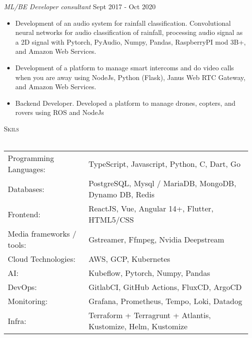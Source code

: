\documentclass[a4paper]{article}
\newcommand{\lineunder} {
    \vspace*{-8pt} \\
    \hspace*{-18pt} \hrulefill \\
}
\newcommand{\header} [1] {
    {\hspace*{-18pt}\vspace*{6pt} \textsc{#1}}
    \vspace*{-6pt} \lineunder
}
\begin{document}
\textit{ML/BE Developer consultant} \hfill Sept 2017 - Oct 2020\\
\vspace{-1mm}
\begin{itemize} \itemsep 1pt
	\item Development of an audio system for rainfall classification. Convolutional neural networks for audio classification of rainfall, processing audio signal as a 2D signal with Pytorch, PyAudio, Numpy, Pandas, RaspberryPI mod 3B+, and Amazon Web Services.
	\item Development of a platform to manage smart intercoms and do video calls when you are away using NodeJs, Python (Flask), Janus Web RTC Gateway, and Amazon Web Services.
	\item Backend Developer. Developed a platform to manage drones, copters, and rovers using ROS and NodeJs
\end{itemize}

\header{Skils}
\begin{tabular}{ l l }
	Programming Languages:    & TypeScript, Javascript, Python, C, Dart, Go                   \\
	Databases:                & PostgreSQL, Mysql / MariaDB, MongoDB, Dynamo DB, Redis        \\
	Frontend:                 & ReactJS, Vue, Angular 14+, Flutter, HTML5/CSS                 \\
	Media frameworks / tools: & Gstreamer, Ffmpeg, Nvidia Deepstream                          \\
	Cloud Technologies:       & AWS, GCP, Kubernetes                                          \\
	AI:                       & Kubeflow, Pytorch, Numpy, Pandas                              \\
	DevOps:                   & GitlabCI, GitHub Actions, FluxCD, ArgoCD                      \\
	Monitoring:               & Grafana, Prometheus, Tempo, Loki, Datadog                     \\
	Infra:                    & Terraform + Terragrunt + Atlantis, Kustomize, Helm, Kustomize \\
\end{tabular}
\vspace{2mm}
\end{document}
